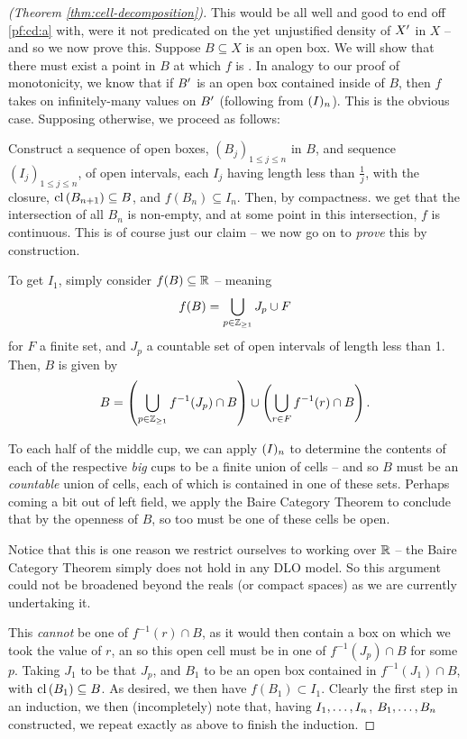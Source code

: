 \begin{proof}[\CD (Theorem \ref{thm:cell-decomposition})]
  This would be all well and good to end off \ref{pf:cd:a} with, were it not predicated on the yet unjustified density of $\Xprime$ in $X$ -- and so we now prove this. Suppose $B \subseteq X$ is an open box. We will show that there must exist a point in $B$ at which $f$ is \cont. In analogy to our proof of monotonicity, we know that if $\Xprime[B]$ is an open box contained inside of $B$, then $f$ takes on infinitely-many values on $\Xprime[B]$ (following from $\In$). This is the obvious case. Supposing otherwise, we proceed as follows:

  Construct a sequence of open boxes, $(B_j)_{1 \leq j \leq n}$ in $B$, and sequence $(I_j)_{1 \leq j \leq n}$, of open intervals, each $I_j$ having length less than $\frac{1}{j}$, with the closure, $\cl{B_{n+1}} \subseteq B$, and $f(B_n) \subseteq I_n$. Then, by compactness. we get that the intersection of all $B_n$ is non-empty, and at some point in this intersection, $f$ is continuous. This is of course just our claim -- we now go on to \emph{prove} this by construction.

  To get $I_1$, simply consider $f(B) \subseteq \R$ -- meaning
  \begin{align*}
    f(B) = \bigcup_{p \in \Zgeq{1}} J_p \cup F
  \end{align*}
  for $F$ a finite set, and $J_p$ a countable set of open intervals of length less than 1. Then, $B$ is given by
  \begin{align*}
    B = \left( \bigcup_{p \in \Zgeq{1}} f^{-1}(J_p) \cap B \right) \cup \left( \bigcup_{r \in F} f^{-1}(r) \cap B \right).
  \end{align*}

  To each half of the middle cup, we can apply $\In$ to determine the contents of each of the respective \emph{big} cups to be a finite union of cells -- and so $B$ must be an \emph{countable} union of cells, each of which is contained in one of these sets. Perhaps coming a bit out of left field, we apply the Baire Category Theorem to conclude that by the openness of $B$, so too must be one of these cells be open.
  \begin{svgraybox}
    Notice that this is one reason we restrict ourselves to working over $\R$ -- the Baire Category Theorem simply does not hold in any DLO model. So this argument could not be broadened beyond the reals (or compact spaces) as we are currently undertaking it.
  \end{svgraybox}
  This \emph{cannot} be one of $f^{-1}(r) \cap B$, as it would then contain a box on which we took the value of $r$, an so this open cell must be in one of $f^{-1}(J_p) \cap B$ for some $p$. Taking $J_1$ to be that $J_p$, and $B_1$ to be an open box contained in $f^{-1}(J_1) \cap B$, with $\cl{B_1} \subseteq B$. As desired, we then have $f(B_1) \subset I_1$. Clearly the first step in an induction, we then (incompletely) note that, having $\vonevm{I}{n}$, $\vonevm{B}{n}$ constructed, we repeat exactly as above to finish the induction.


\end{proof}
